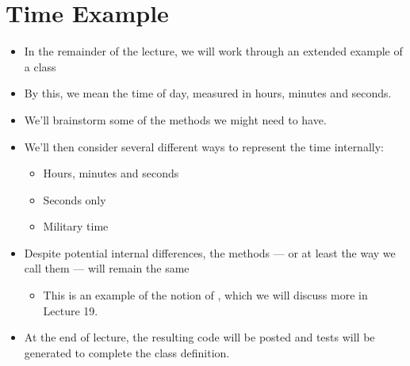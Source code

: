 \documentclass[letterpaper,10pt,english]{sphinxmanual}
\begin{document}
\section{Time Example}
\label{\detokenize{lecture_notes/lec18_classes1:time-example}}\begin{itemize}
\item {} 
In the remainder of the lecture, we will work through an extended
example of a  class

\item {} 
By this, we mean the time of day, measured in hours, minutes and
seconds.

\item {} 
We’ll brainstorm some of the methods we might need to have.

\item {} 
We’ll then consider several different ways to represent the time
internally:
\begin{itemize}
\item {} 
Hours, minutes and seconds

\item {} 
Seconds only

\item {} 
Military time

\end{itemize}

\item {} 
Despite potential internal differences, the methods — or at least the
way we call them — will remain the same
\begin{itemize}
\item {} 
This is an example of the notion of , which we will
discuss more in Lecture 19.

\end{itemize}

\item {} 
At the end of lecture, the resulting code will be posted and
tests will be generated to complete the class definition.

\end{itemize}
\end{document}
